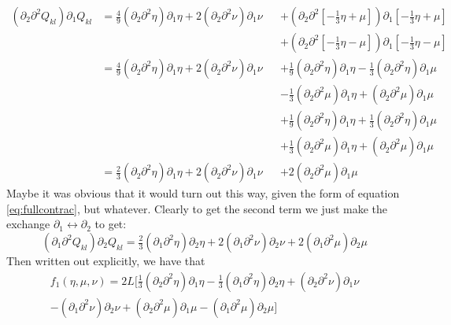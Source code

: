 \documentclass[reqno]{article}
\begin{document}
	\begin{equation}
	\begin{alignedat}{2}
		\left(\partial_2 \partial^2 Q_{kl}\right) \partial_1 Q_{kl} &= \tfrac49 \left(\partial_2\partial^2\eta\right)\partial_1\eta + 2\left( \partial_2\partial^2 \nu \right) \partial_1 \nu &&+ \left( \partial_2\partial^2 \left[ -\tfrac13\eta + \mu \right] \right) \partial_1\left[-\tfrac13\eta + \mu\right] \\
		& &&+  \left( \partial_2\partial^2 \left[ -\tfrac13\eta - \mu \right] \right) \partial_1\left[-\tfrac13\eta - \mu\right] \\
		&= \tfrac49 \left(\partial_2\partial^2\eta\right)\partial_1\eta + 2\left( \partial_2\partial^2 \nu \right) \partial_1 \nu &&+ \tfrac19\left( \partial_2\partial^2 \eta \right)\partial_1 \eta - \tfrac13 \left( \partial_2\partial^2 \eta \right) \partial_1 \mu \\
		& &&- \tfrac13 \left( \partial_2\partial^2\mu \right)\partial_1\eta + \left( \partial_2\partial^2 \mu \right)\partial_1\mu \\
		& &&+ \tfrac19 \left( \partial_2\partial^2 \eta \right) \partial_1 \eta + \tfrac13\left( \partial_2 \partial^2 \eta \right)\partial_1 \mu \\
		& &&+ \tfrac13\left( \partial_2\partial^2 \mu \right) \partial_1 \eta + \left( \partial_2 \partial^2 \mu \right)\partial_1 \mu \\
		&= \tfrac23\left( \partial_2\partial^2 \eta \right)\partial_1\eta + 2\left( \partial_2\partial^2\nu \right)\partial_1 \nu &&+ 2\left( \partial_2\partial^2 \mu \right)\partial_1\mu
	\end{alignedat}
	\end{equation}
	Maybe it was obvious that it would turn out this way, given the form of equation \eqref{eq:fullcontrac}, but whatever. Clearly to get the second term we just make the exchange $\partial_1 \leftrightarrow \partial_2$ to get:
	\begin{equation}
		\left( \partial_1\partial^2 Q_{kl}\right)\partial_2 Q_{kl} = \tfrac23\left( \partial_1\partial^2 \eta \right)\partial_2\eta + 2\left( \partial_1\partial^2\nu \right)\partial_2 \nu + 2\left( \partial_1\partial^2 \mu \right)\partial_2\mu
	\end{equation}
	Then written out explicitly, we have that
	\begin{multline}\label{eq:f1}
		f_1(\eta, \mu, \nu) = 2L \bigg[ \tfrac13 \left( \partial_2\partial^2 \eta \right) \partial_1 \eta - \tfrac13 \left( \partial_1\partial^2 \eta\right)\partial_2 \eta + \left(\partial_2 \partial^2 \nu\right)\partial_1 \nu \\ - \left(\partial_1 \partial^2 \nu\right)\partial_2 \nu + \left(\partial_2 \partial^2 \mu\right)\partial_1 \mu - \left(\partial_1 \partial^2 \mu\right)\partial_2 \mu \bigg]
	\end{multline}
\end{document}
